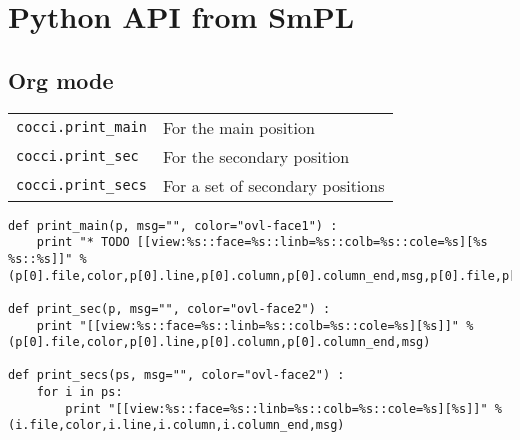\documentclass{article}
\begin{document}
\section{Python API from SmPL}
\label{sec:python-api}

\subsection{Org mode}
\label{sec:orgmode}

\begin{tabular}{lp{8cm}}
\texttt{cocci.print\_main}& For the main position            \\
\texttt{cocci.print\_sec} & For the secondary position       \\
\texttt{cocci.print\_secs}& For a set of secondary positions \\
\end{tabular}

\begin{lstlisting}
def print_main(p, msg="", color="ovl-face1") :
	print "* TODO [[view:%s::face=%s::linb=%s::colb=%s::cole=%s][%s %s::%s]]" % (p[0].file,color,p[0].line,p[0].column,p[0].column_end,msg,p[0].file,p[0].line)

def print_sec(p, msg="", color="ovl-face2") :
	print "[[view:%s::face=%s::linb=%s::colb=%s::cole=%s][%s]]" % (p[0].file,color,p[0].line,p[0].column,p[0].column_end,msg)

def print_secs(ps, msg="", color="ovl-face2") :
	for i in ps:
		print "[[view:%s::face=%s::linb=%s::colb=%s::cole=%s][%s]]" % (i.file,color,i.line,i.column,i.column_end,msg)
\end{lstlisting}

\end{document}

